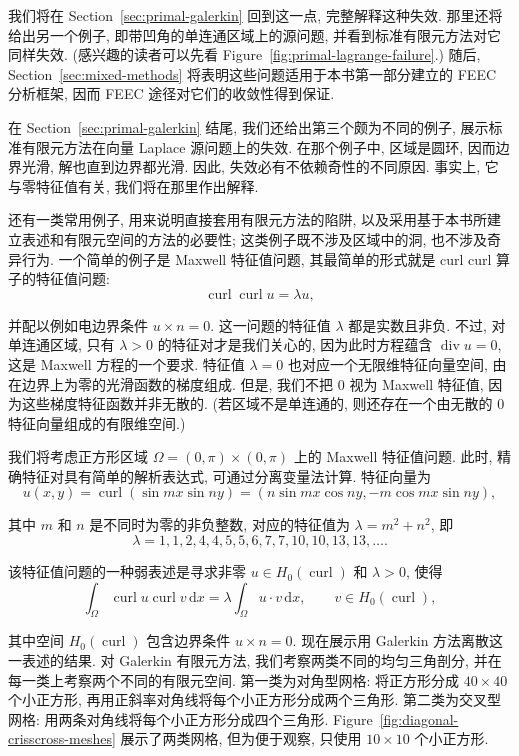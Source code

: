 我们将在 Section~\ref{sec:primal-galerkin} 回到这一点, 完整解释这种失效. 那里还将给出另一个例子, 即带凹角的单连通区域上的源问题, 并看到标准有限元方法对它同样失效. (感兴趣的读者可以先看 Figure~\ref{fig:primal-lagrange-failure}.) 随后, Section~\ref{sec:mixed-methods} 将表明这些问题适用于本书第一部分建立的 FEEC 分析框架, 因而 FEEC 途径对它们的收敛性得到保证.

在 Section~\ref{sec:primal-galerkin} 结尾, 我们还给出第三个颇为不同的例子, 展示标准有限元方法在向量 Laplace 源问题上的失效. 在那个例子中, 区域是圆环, 因而边界光滑, 解也直到边界都光滑. 因此, 失效必有不依赖奇性的不同原因. 事实上, 它与零特征值有关, 我们将在那里作出解释.

还有一类常用例子, 用来说明直接套用有限元方法的陷阱, 以及采用基于本书所建立表述和有限元空间的方法的必要性; 这类例子既不涉及区域中的洞, 也不涉及奇异行为. 一个简单的例子是 Maxwell 特征值问题, 其最简单的形式就是 curl curl 算子的特征值问题:
\[
\operatorname{curl}\operatorname{curl}u=\lambda u,
\]

并配以例如电边界条件 $u\times n=0$. 这一问题的特征值 $\lambda$ 都是实数且非负. 不过, 对单连通区域, 只有 $\lambda>0$ 的特征对才是我们关心的, 因为此时方程蕴含 $\operatorname{div}u=0$, 这是 Maxwell 方程的一个要求. 特征值 $\lambda=0$ 也对应一个无限维特征向量空间, 由在边界上为零的光滑函数的梯度组成. 但是, 我们不把 0 视为 Maxwell 特征值, 因为这些梯度特征函数并非无散的. (若区域不是单连通的, 则还存在一个由无散的 0 特征向量组成的有限维空间.)

我们将考虑正方形区域 $\Omega=(0,\pi)\times(0,\pi)$ 上的 Maxwell 特征值问题. 此时, 精确特征对具有简单的解析表达式, 可通过分离变量法计算. 特征向量为
\[
u(x,y)=\operatorname{curl}(\sin mx\sin ny)=(n\sin mx\cos ny,-m\cos mx\sin ny),
\]

其中 $m$ 和 $n$ 是不同时为零的非负整数, 对应的特征值为 $\lambda=m^2+n^2$, 即
\[
\lambda=1,1,2,4,4,5,5,6,7,7,10,10,13,13,\ldots.
\]

该特征值问题的一种弱表述是寻求非零 $u\in H_0(\operatorname{curl})$ 和 $\lambda>0$, 使得
\[
\int_\Omega\operatorname{curl}u\operatorname{curl}v\,\mathrm{d}x=\lambda\int_\Omega u\cdot v\,\mathrm{d}x,\qquad v\in H_0(\operatorname{curl}),
\]

其中空间 $ H_0(\operatorname{curl})$ 包含边界条件 $u\times n=0$. 现在展示用 Galerkin 方法离散这一表述的结果. 对 Galerkin 有限元方法, 我们考察两类不同的均匀三角剖分, 并在每一类上考察两个不同的有限元空间. 第一类为对角型网格: 将正方形分成 $40\times40$ 个小正方形, 再用正斜率对角线将每个小正方形分成两个三角形. 第二类为交叉型网格: 用两条对角线将每个小正方形分成四个三角形. Figure~\ref{fig:diagonal-crisscross-meshes} 展示了两类网格, 但为便于观察, 只使用 $10\times10$ 个小正方形.

